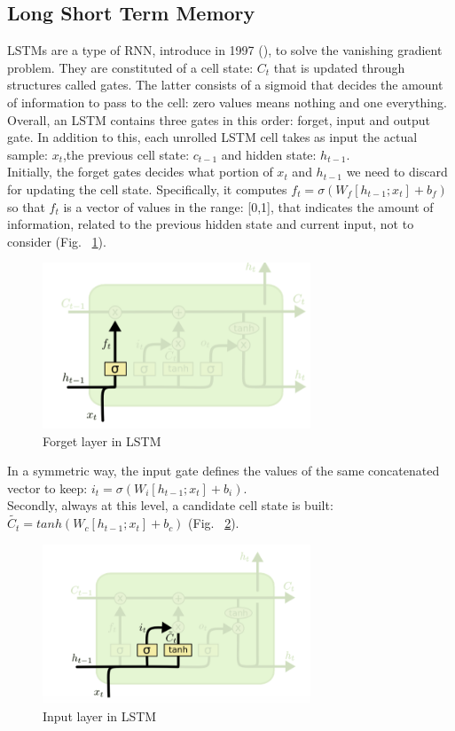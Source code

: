 \documentclass[LaM,binding=0.6cm]{sapthesis}
\begin{document}
\subsection{Long Short Term Memory}
LSTMs are a type of RNN, introduce in 1997 (\cite{lstmop}), to solve the vanishing gradient problem. They are constituted of a cell state: $C_t$ that is updated through structures called gates. The latter consists of a sigmoid that decides the amount of information to pass to the cell: zero values means nothing and one everything. Overall, an LSTM contains three gates in this order: forget, input and output gate. In addition to this, each unrolled LSTM cell takes as input the actual sample: $x_t$,the previous cell state: $c_{t-1}$ and hidden state: $h_{t-1}$.\\Initially, the forget gates decides what portion of $x_t$ and $h_{t-1}$ we need to discard for updating the cell state. Specifically, it computes $f_t=\sigma\left(W_f[h_{t-1};x_t]+b_f\right)$ so that $f_t$ is a vector of values in the range: [0,1], that indicates the amount of information, related to the  previous hidden state and current input, not to consider (Fig. ~\ref{fig:lstms1}).
\begin{figure}[H]  \centering
    \includegraphics[width=80mm,scale=0.7]{lstms1}
    \caption{Forget layer in LSTM \cite{lstmsite}}
    \label{fig:lstms1}
\end{figure}
In a symmetric way, the input gate defines the values of the same concatenated vector to keep: $i_t=\sigma\left(W_i[h_{t-1};x_t]+b_i\right)$.\\Secondly, always at this level, a candidate cell state is built: $\widetilde{C_t}=tanh\left(W_c[h_{t-1};x_t]+b_c\right)$ (Fig. ~\ref{fig:lstms2}).
\begin{figure}[H]  \centering
    \includegraphics[width=80mm,scale=0.7]{lstms2}
    \caption{Input layer in LSTM \cite{lstmsite}}
    \label{fig:lstms2}
\end{figure}
\end{document}
